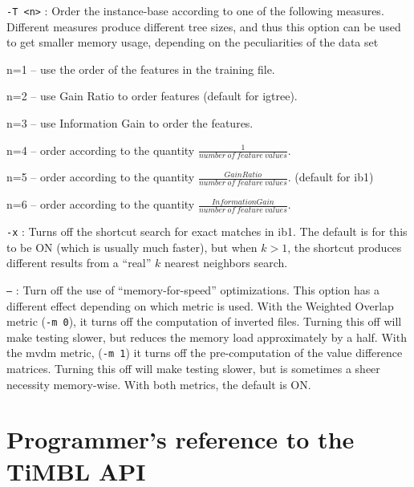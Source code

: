 \documentclass{report}
\begin{document}
\begin{description}
\item {\tt -T <n>} : Order the instance-base according to one of the
	      following measures. Different measures produce different
	      tree sizes, and thus this option can be used to get
	      smaller memory usage, depending on the peculiarities
	      of the data set

	\begin{description}
	\item n=1 -- use the order of the features in the training
	file.
	\item n=2 -- use Gain Ratio to order features (default for
	{\sc igtree}).
	\item n=3 -- use Information Gain to order the features.
	\item n=4 -- order according to the quantity $\frac{1}{number
	\ of\ feature\ values}$.
	\item n=5 -- order according to the quantity $\frac{Gain
	Ratio}{number\ of\ feature\ values}$. (default for {\sc ib1})
	\item n=6 -- order according to the quantity $\frac{Information
	Gain}{number\ of\ feature\ values}$.
	\end{description}

\item {\tt -x} : Turns off the shortcut search for exact matches in
{\sc ib1}. The default is for this to be ON (which is usually much faster),
but when $k>1$, the shortcut produces different results from a
``real'' $k$ nearest neighbors search.

\item {\tt --} : Turn off the use of ``memory-for-speed''
optimizations. This option has a different effect depending on which
metric is used. With the Weighted Overlap metric ({\tt -m 0}), it
turns off the computation of inverted files. Turning this off will
make testing slower, but reduces the memory load approximately by a
half. With the {\sc mvdm} metric, ({\tt -m 1}) it turns off the
pre-computation of the value difference matrices. Turning this off
will make testing slower, but is sometimes a sheer necessity
memory-wise. With both metrics, the default is ON.

\end{description}

\chapter{Programmer's reference to the TiMBL API}
\label{programmers}
\end{document}
